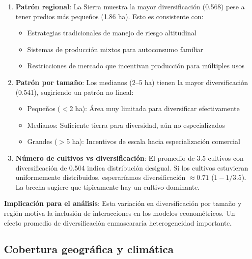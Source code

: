 \documentclass[11pt,a4paper]{article}
\begin{document}
\begin{enumerate}
    \item \textbf{Patrón regional}: La Sierra muestra la mayor diversificación (0.568) pese a tener predios más pequeños (1.86 ha). Esto es consistente con:
    \begin{itemize}
        \item Estrategias tradicionales de manejo de riesgo altitudinal
        \item Sistemas de producción mixtos para autoconsumo familiar
        \item Restricciones de mercado que incentivan producción para múltiples usos
    \end{itemize}
    
    \item \textbf{Patrón por tamaño}: Los medianos (2--5 ha) tienen la mayor diversificación (0.541), sugiriendo un patrón no lineal:
    \begin{itemize}
        \item Pequeños ($<$2 ha): Área muy limitada para diversificar efectivamente
        \item Medianos: Suficiente tierra para diversidad, aún no especializados
        \item Grandes ($>$5 ha): Incentivos de escala hacia especialización comercial
    \end{itemize}
    
    \item \textbf{Número de cultivos vs diversificación}: El promedio de 3.5 cultivos con diversificación de 0.504 indica distribución desigual. Si los cultivos estuvieran uniformemente distribuidos, esperaríamos diversificación $\approx 0.71$ ($1-1/3.5$). La brecha sugiere que típicamente hay un cultivo dominante.
\end{enumerate}

\textbf{Implicación para el análisis}: Esta variación en diversificación por tamaño y región motiva la inclusión de interacciones en los modelos econométricos. Un efecto promedio de diversificación enmascararía heterogeneidad importante.

\subsection{Cobertura geográfica y climática}
\end{document}
